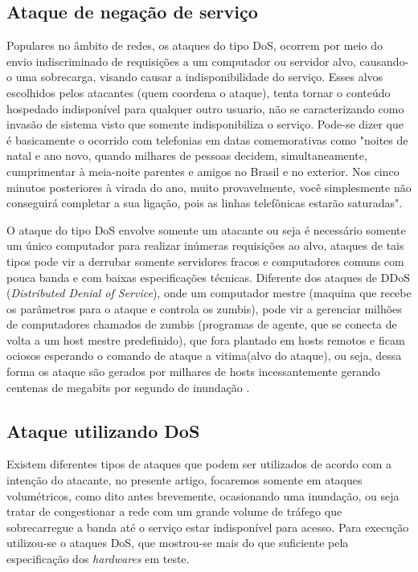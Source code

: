 \documentclass[12pt]{article}
\begin{document}
  \subsection{Ataque de negação de serviço} \label{sec:ddos}
    Populares no âmbito de redes, os ataques do tipo DoS, ocorrem por meio do envio indiscriminado de requisições a um computador ou servidor alvo, causando-o uma sobrecarga, visando causar a indisponibilidade do serviço. Esses alvos escolhidos pelos atacantes (quem coordena o ataque), tenta tornar o conteúdo hospedado indisponível para qualquer outro usuario, não se caracterizando como invasão de sistema visto que somente indisponibiliza o serviço. Pode-se dizer que é basicamente o ocorrido com telefonias em datas comemorativas como "noites de natal e ano novo, quando milhares de pessoas decidem, simultaneamente, cumprimentar à meia-noite parentes e amigos no Brasil e no exterior. Nos cinco minutos posteriores à virada do ano, muito provavelmente, você simplesmente não conseguirá completar a sua ligação, pois as linhas telefônicas estarão saturadas"\cite{ddOS}.


    O ataque do tipo DoS envolve somente um atacante ou seja é necessário somente um único computador para realizar inúmeras requisições ao alvo, ataques de tais tipos pode vir a derrubar somente servidores fracos e computadores comuns com pouca banda e com baixas especificações técnicas. Diferente dos ataques de DDoS (\textit{Distributed Denial of Service}), onde um computador mestre (maquina que recebe os parâmetros para o ataque e controla os zumbis), pode vir a gerenciar milhões de computadores chamados de zumbis (programas de agente, que se conecta de volta a um host mestre predefinido), que fora plantado em hosts remotos e ficam ociosos esperando o comando de ataque a vitima(alvo do ataque), ou seja, dessa forma os ataque são gerados por milhares de hosts incessantemente gerando centenas de megabits por segundo de inundação \cite{ddOS2}. 
  
  \subsection{Ataque utilizando DoS} \label{sec:ataquedos}
    Existem diferentes tipos de ataques que podem ser utilizados de acordo com a intenção do atacante, 
    no presente artigo, focaremos somente em ataques volumétricos, como dito antes brevemente, ocasionando uma inundação, ou seja tratar de congestionar a rede com um grande volume
    de tráfego que sobrecarregue a banda até o serviço estar indisponível para acesso. Para execução utilizou-se o ataques DoS, que mostrou-se mais do que suficiente pela especificação dos \textit{hardwares} em teste.
         
\end{document}
